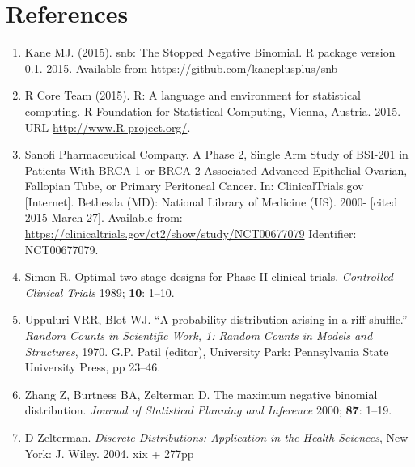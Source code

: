 \documentclass[12pt]{article}         %
\begin{document}


\section*     {\bf References}


\begin{enumerate}

\item[\bibref{Kane 2015}]
Kane MJ. (2015). snb: The Stopped Negative Binomial. R package version 0.1. 2015. Available from \url{https://github.com/kaneplusplus/snb}


\item[\bibref{R Core Team 2015}]
R Core Team (2015). R: A language and environment for statistical
computing. R Foundation for Statistical Computing, Vienna, Austria. 2015. URL \url{http://www.R-project.org/}.

\item[\bibref{Sanofi 2013}]
Sanofi Pharmaceutical Company. A Phase 2, Single Arm Study of BSI-201 in Patients With BRCA-1 or BRCA-2 Associated Advanced Epithelial Ovarian, Fallopian Tube, or Primary Peritoneal Cancer. In: ClinicalTrials.gov [Internet]. Bethesda (MD): National Library of Medicine (US). 2000- [cited 2015 March 27]. Available from: \url{https://clinicaltrials.gov/ct2/show/study/NCT00677079} Identifier: NCT00677079.

\item[\bibref{Simon 1989}]
Simon R.  Optimal two-stage designs for Phase II clinical trials. {\it Controlled Clinical Trials\/} 1989; {\bf 10}: 1--10.

\item[\bibref{Uppuluri 1970}] 
Uppuluri VRR, Blot WJ. ``A probability distribution arising in a riff-shuffle.'' {\it Random Counts  in Scientific Work, 1: Random Counts in Models and Structures}, 1970. G.P. Patil (editor), University Park: Pennsylvania State University Press, pp  23--46.

\item[\bibref{Zhang 2000}]
Zhang Z, Burtness BA, Zelterman D.  The maximum negative binomial distribution. {\em Journal of Statistical Planning and Inference\/}  2000; {\bf 87}: 1--19.

\item[\bibref{Zelterman 2004}]
D Zelterman. {\it Discrete Distributions: Application in 
the Health Sciences}, New York: J. Wiley. 2004. xix + 277pp

\end{enumerate}
\end{document}

